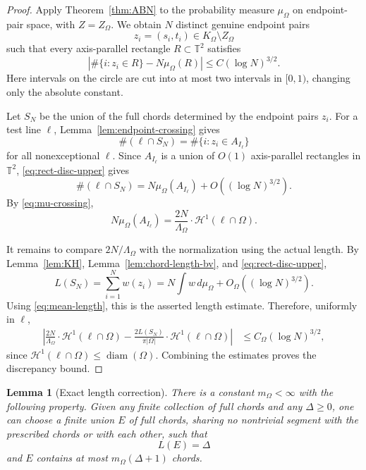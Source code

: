 \documentclass[11pt]{article}
\newtheorem{lemma}[theorem]{Lemma}
\theoremstyle{definition}
\newcommand{\T}{\mathbb T}
\newcommand{\cH}{\mathcal H}
\newcommand{\diam}{\operatorname{diam}}
\begin{document}
\begin{proof}
Apply Theorem~\ref{thm:ABN} to the probability measure $\mu_\Omega$ on endpoint-pair space, with $Z=Z_\Omega$.  We obtain $N$ distinct genuine endpoint pairs
\[
        z_i=(s_i,t_i)\in K_\Omega\setminus Z_\Omega
\]
such that every axis-parallel rectangle $R\subset\T^2$ satisfies
\begin{equation}\label{eq:rect-disc-upper}
        \left|
        \#\{i:z_i\in R\}-N\mu_\Omega(R)
        \right|
        \le C(\log N)^{3/2}.
\end{equation}
Here intervals on the circle are cut into at most two intervals in $[0,1)$, changing only the absolute constant.

\bigskip
\noindent
Let $S_N$ be the union of the full chords determined by the endpoint pairs $z_i$.  For a test line $\ell$, Lemma~\ref{lem:endpoint-crossing} gives
\[
        \#(\ell\cap S_N)
        =
        \#\{i:z_i\in A_{I_\ell}\}
\]
for all nonexceptional $\ell$.  Since $A_{I_\ell}$ is a union of $O(1)$ axis-parallel rectangles in $\T^2$, \eqref{eq:rect-disc-upper} gives
\[
        \#(\ell\cap S_N)
        =N\mu_\Omega(A_{I_\ell})+O((\log N)^{3/2}).
\]
By \eqref{eq:mu-crossing},
\[
        N\mu_\Omega(A_{I_\ell})
        =
        \frac{2N}{\Lambda_\Omega}\cdot\cH^1(\ell\cap\Omega).
\]

\smallskip
\noindent
It remains to compare $2N/\Lambda_\Omega$ with the normalization using the actual length.  By Lemma~\ref{lem:KH}, Lemma~\ref{lem:chord-length-bv}, and \eqref{eq:rect-disc-upper},
\[
        L(S_N)=\sum_{i=1}^N w(z_i)
        =N\int w\,d\mu_\Omega+O_\Omega((\log N)^{3/2}).
\]
Using \eqref{eq:mean-length}, this is the asserted length estimate.  Therefore, uniformly in $\ell$,
\[
\begin{aligned}
\left|
\frac{2N}{\Lambda_\Omega}\cdot\cH^1(\ell\cap\Omega)
-
\frac{2L(S_N)}{\pi|\Omega|}\cdot\cH^1(\ell\cap\Omega)
\right|
&\le C_\Omega(\log N)^{3/2},
\end{aligned}
\]
since $\cH^1(\ell\cap\Omega)\le\diam(\Omega)$.  Combining the estimates proves the discrepancy bound.
\end{proof}

\begin{lemma}[Exact length correction]\label{lem:exact-length-correction}
There is a constant $m_\Omega<\infty$ with the following property.  Given any finite collection of full chords and any $\Delta\ge0$, one can choose a finite union $E$ of full chords, sharing no nontrivial segment with the prescribed chords or with each other, such that
\[
        L(E)=\Delta
\]
and $E$ contains at most $m_\Omega(\Delta+1)$ chords.
\end{lemma}
\end{document}
